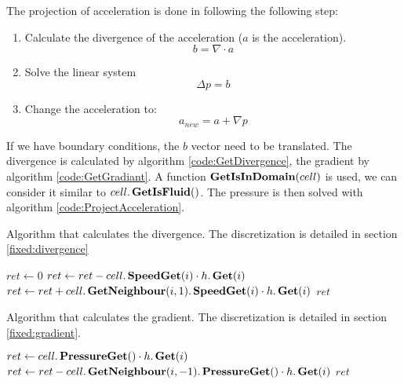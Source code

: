 The projection of acceleration is done in following the following step:
\begin{enumerate}
 \item Calculate the divergence of the acceleration ($a$ is the acceleration).
 \begin{equation}
  b=\nabla \cdot a
 \end{equation}
 \item Solve the linear system
 \begin{equation}
  \Delta p=b
 \end{equation}
 \item Change the acceleration to:
 \begin{equation}
  a_{new}=a+\nabla p
 \end{equation}
\end{enumerate}
If we have boundary conditions, the $b$ vector need to be translated.
The divergence is calculated by algorithm \ref{code:GetDivergence}, the gradient by algorithm \ref{code:GetGradiant}.
A function $\mathop{\textbf{GetIsInDomain}}(cell)$ is used, we can consider it similar to $cell.\mathop{\textbf{GetIsFluid}}()$.
The pressure is then solved with algorithm \ref{code:ProjectAcceleration}.

\begin{algorithm}
\caption{Algorithm that calculates the divergence. The discretization is detailed in section \ref{fixed:divergence}}
\label{code:GetDivergence}
\begin{algorithmic}[1]
		\State $ret\gets 0$
			\State $ret\gets ret-cell.\mathop{\textbf{SpeedGet}}(i)\cdot h.\mathop{\textbf{Get}}(i)$
			\State $ret\gets ret+cell.\mathop{\textbf{GetNeighbour}}(i,1).\mathop{\textbf{SpeedGet}}(i) \cdot h.\mathop{\textbf{Get}}(i)$
		\EndFor
		\State \Return $ret$
	\EndFunction
	 \end{algorithmic}
\end{algorithm}

\begin{algorithm}
\caption{Algorithm that calculates the gradient. The discretization is detailed in section \ref{fixed:gradient}.}
\label{code:GetGradiant}
\begin{algorithmic}[1]
		\State $ret\gets cell.\mathop{\textbf{PressureGet}}()\cdot h.\mathop{\textbf{Get}}(i)$
		\State $ret\gets ret-cell.\mathop{\textbf{GetNeighbour}}(i,-1).\mathop{\textbf{PressureGet}}()\cdot h.\mathop{\textbf{Get}}(i)$
		\State \Return $ret$
\EndFunction
		 \end{algorithmic}
\end{algorithm}


